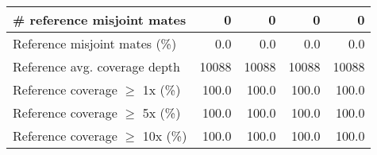 \documentclass[12pt,a4paper]{article}
\begin{document}
\begin{table}[ht]
\begin{center}
\begin{tabular}{|l*{4}{|r}|}
\# reference misjoint mates & 0 & 0 & 0 & 0 \\ \hline
Reference misjoint mates (\%) & 0.0 & 0.0 & 0.0 & 0.0 \\ \hline
Reference avg. coverage depth & 10088 & 10088 & 10088 & 10088 \\ \hline
Reference coverage $\geq$ 1x (\%) & 100.0 & 100.0 & 100.0 & 100.0 \\ \hline
Reference coverage $\geq$ 5x (\%) & 100.0 & 100.0 & 100.0 & 100.0 \\ \hline
Reference coverage $\geq$ 10x (\%) & 100.0 & 100.0 & 100.0 & 100.0 \\ \hline
\end{tabular}
\end{center}
\end{table}
\end{document}
